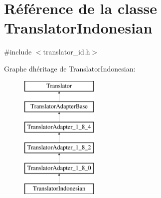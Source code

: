 \hypertarget{class_translator_indonesian}{}\section{Référence de la classe Translator\+Indonesian}
\label{class_translator_indonesian}


{\ttfamily \#include $<$translator\+\_\+id.\+h$>$}

Graphe d\textquotesingle{}héritage de Translator\+Indonesian\+:\begin{figure}[H]
\begin{center}
\leavevmode
\includegraphics[height=6.000000cm]{class_translator_indonesian}
\end{center}
\end{figure}
